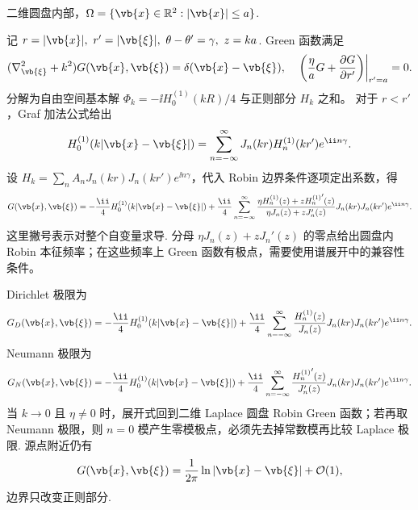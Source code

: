 \begin{exbox}
	二维圆盘内部，\(\Omega=\{\vb{x}\in\mathbb{R}^2:|\vb{x}|\leq a\}\).
	
	记 \(r=|\vb{x}|,\ r'=|\vb{\xi}|,\ \theta-\theta'=\gamma,\ z=ka\). Green 函数满足
	\begin{align*}
		(\nabla_{\vb{\xi}}^2+k^2)G(\vb{x},\vb{\xi})=\delta(\vb{x}-\vb{\xi}),
		\quad
		\left.\left(\frac{\eta}{a}G+\frac{\partial G}{\partial r'}\right)\right|_{r'=a}=0.
	\end{align*}
	分解为自由空间基本解 \(\Phi_k=-\ii H_0^{(1)}(kR)/4\) 与正则部分 \(H_k\) 之和。
	对于 \(r<r'\)，Graf 加法公式给出
	\begin{align*}
		H_0^{(1)}(k|\vb{x}-\vb{\xi}|)=\sum_{n=-\infty}^{\infty}J_n(kr)H_n^{(1)}(kr')e^{\ii n\gamma}.
	\end{align*}
	设 \(H_k=\sum_{n}A_nJ_n(kr)J_n(kr')e^{\ii n\gamma}\)，代入 Robin 边界条件逐项定出系数，得
	\begin{align*}
		G(\vb{x},\vb{\xi})=-\frac{\ii}{4}H_0^{(1)}(k|\vb{x}-\vb{\xi}|)
		+\frac{\ii}{4}\sum_{n=-\infty}^{\infty}
		\frac{\eta H_n^{(1)}(z)+z{H_n^{(1)}}'(z)}{\eta J_n(z)+zJ_n'(z)}
		J_n(kr)J_n(kr')e^{\ii n\gamma}.
	\end{align*}
	这里撇号表示对整个自变量求导. 分母 \(\eta J_n(z)+zJ_n'(z)\) 的零点给出圆盘内 Robin 本征频率；在这些频率上 Green 函数有极点，需要使用谱展开中的兼容性条件。
	
	Dirichlet 极限为
	\begin{align*}
		G_D(\vb{x},\vb{\xi})=-\frac{\ii}{4}H_0^{(1)}(k|\vb{x}-\vb{\xi}|)
		+\frac{\ii}{4}\sum_{n=-\infty}^{\infty}
		\frac{H_n^{(1)}(z)}{J_n(z)}J_n(kr)J_n(kr')e^{\ii n\gamma}.
	\end{align*}
	Neumann 极限为
	\begin{align*}
		G_N(\vb{x},\vb{\xi})=-\frac{\ii}{4}H_0^{(1)}(k|\vb{x}-\vb{\xi}|)
		+\frac{\ii}{4}\sum_{n=-\infty}^{\infty}
		\frac{{H_n^{(1)}}'(z)}{J_n'(z)}J_n(kr)J_n(kr')e^{\ii n\gamma}.
	\end{align*}
	当 \(k\to0\) 且 \(\eta\neq0\) 时，展开式回到二维 Laplace 圆盘 Robin Green 函数；若再取 Neumann 极限，则 \(n=0\) 模产生零模极点，必须先去掉常数模再比较 Laplace 极限. 源点附近仍有
	\begin{align*}
		G(\vb{x},\vb{\xi})=\frac{1}{2\pi}\ln|\vb{x}-\vb{\xi}|+\mathcal{O}(1),
	\end{align*}
	边界只改变正则部分.
\end{exbox}

